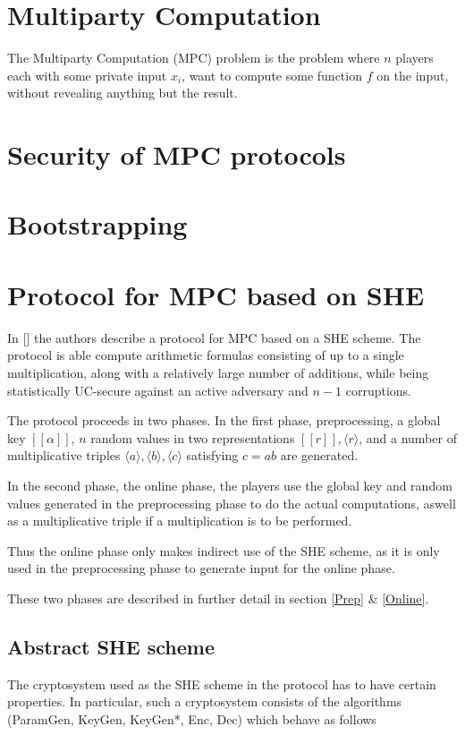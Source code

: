 \documentclass{article}
\begin{document}
\section{Multiparty Computation}
The Multiparty Computation (MPC) problem is the problem where $n$ players each with some private input $x_i$, want to compute some function $f$ on the input, without revealing anything but the result.
\section{Security of MPC protocols}
\section{Bootstrapping}
\section{Protocol for MPC based on SHE}
In [] the authors describe a protocol for MPC based on a SHE scheme. The protocol is able compute arithmetic formulas consisting of up to a single multiplication, along with a relatively large number of additions, while being statistically UC-secure against an active adversary and $n - 1$ corruptions.

The protocol proceeds in two phases. In the first phase, preprocessing, a global key $[\![\alpha]\!]$, $n$ random values in two representations $[\![r]\!], \langle r \rangle$, and a number of multiplicative triples $\langle a \rangle, \langle b \rangle, \langle c \rangle$ satisfying $c = ab$ are generated. 

In the second phase, the online phase, the players use the global key and random values generated in the preprocessing phase to do the actual computations, aswell as a multiplicative triple if a multiplication is to be performed.

Thus the online phase only makes indirect use of the SHE scheme, as it is only used in the preprocessing phase to generate input for the online phase.

These two phases are described in further detail in section \ref{Prep} \& \ref{Online}.

\subsection{Abstract SHE scheme}
The cryptosystem used as the SHE scheme in the protocol has to have certain properties. In particular, such a cryptosystem consists of the algorithms (ParamGen, KeyGen, KeyGen*, Enc, Dec) which behave as follows
\end{document}
